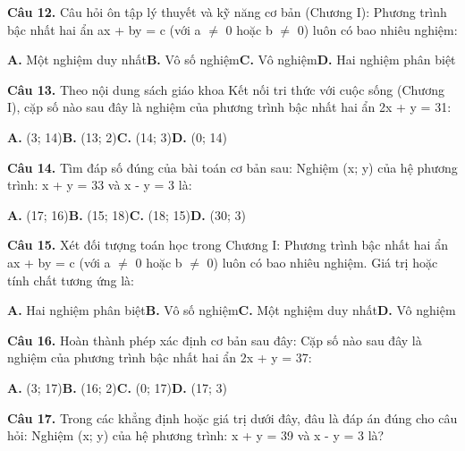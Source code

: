 \documentclass[11pt,a4paper]{article}
\begin{document}
\textbf{\color{primary} Câu 12.} Câu hỏi ôn tập lý thuyết và kỹ năng cơ bản (Chương I): Phương trình bậc nhất hai ẩn ax + by = c (với a $\ne$ 0 hoặc b $\ne$ 0) luôn có bao nhiêu nghiệm:\par
\hspace*{1.5em}\textbf{A.} Một nghiệm duy nhất\quad\quad \textbf{B.} Vô số nghiệm\quad\quad \textbf{C.} Vô nghiệm\quad\quad \textbf{D.} Hai nghiệm phân biệt\par\vspace{2pt}
\textbf{\color{primary} Câu 13.} Theo nội dung sách giáo khoa Kết nối tri thức với cuộc sống (Chương I), cặp số nào sau đây là nghiệm của phương trình bậc nhất hai ẩn 2x + y = 31:\par
\hspace*{1.5em}\textbf{A.} (3; 14)\quad\quad \textbf{B.} (13; 2)\quad\quad \textbf{C.} (14; 3)\quad\quad \textbf{D.} (0; 14)\par\vspace{2pt}
\textbf{\color{primary} Câu 14.} Tìm đáp số đúng của bài toán cơ bản sau: Nghiệm (x; y) của hệ phương trình: x + y = 33 và x - y = 3 là:\par
\hspace*{1.5em}\textbf{A.} (17; 16)\quad\quad \textbf{B.} (15; 18)\quad\quad \textbf{C.} (18; 15)\quad\quad \textbf{D.} (30; 3)\par\vspace{2pt}
\textbf{\color{primary} Câu 15.} Xét đối tượng toán học trong Chương I: Phương trình bậc nhất hai ẩn ax + by = c (với a $\ne$ 0 hoặc b $\ne$ 0) luôn có bao nhiêu nghiệm. Giá trị hoặc tính chất tương ứng là:\par
\hspace*{1.5em}\textbf{A.} Hai nghiệm phân biệt\quad\quad \textbf{B.} Vô số nghiệm\quad\quad \textbf{C.} Một nghiệm duy nhất\quad\quad \textbf{D.} Vô nghiệm\par\vspace{2pt}
\textbf{\color{primary} Câu 16.} Hoàn thành phép xác định cơ bản sau đây: Cặp số nào sau đây là nghiệm của phương trình bậc nhất hai ẩn 2x + y = 37:\par
\hspace*{1.5em}\textbf{A.} (3; 17)\quad\quad \textbf{B.} (16; 2)\quad\quad \textbf{C.} (0; 17)\quad\quad \textbf{D.} (17; 3)\par\vspace{2pt}
\textbf{\color{primary} Câu 17.} Trong các khẳng định hoặc giá trị dưới đây, đâu là đáp án đúng cho câu hỏi: Nghiệm (x; y) của hệ phương trình: x + y = 39 và x - y = 3 là?\par
\end{document}
